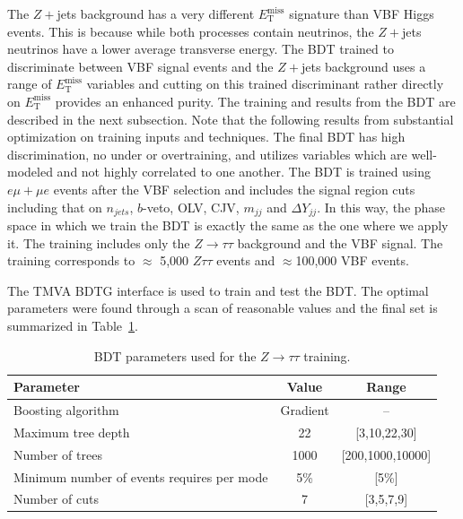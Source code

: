The $Z+$jets background has a very different $E_{\text{T}}^{\text{miss}}$ signature than VBF Higgs events. This is because while both processes contain neutrinos, the $Z+$jets neutrinos have a lower average transverse energy. The BDT trained to discriminate between VBF signal events and the $Z+$jets background uses a range of $E_{\text{T}}^{\text{miss}}$ variables and cutting on this trained discriminant rather directly on $E_{\text{T}}^{\text{miss}}$ provides an enhanced purity. The training and results from the BDT are described in the next subsection. Note that the following results from substantial optimization on training inputs and techniques. The final BDT has high discrimination, no under or overtraining, and utilizes variables which are well-modeled and not highly correlated to one another.  
The BDT is trained using $e\mu+\mu e$ events after the VBF selection and includes the signal region cuts including that on $n_{jets}$, $b$-veto, OLV, CJV, $m_{jj}$ and $\Delta Y_{jj}$. In this way, the phase space in which we train the BDT is exactly the same as the one where we apply it. The training includes only the $Z\rightarrow\tau\tau$ background and the VBF signal. The training corresponds to $\approx$ 5,000 $Z\tau\tau$ events and $\approx$100,000 VBF events.

The TMVA BDTG interface is used to train and test the BDT. The optimal parameters were found through a scan of reasonable values and the final set is summarized in Table~\ref{tab:ZBDTparameters}.

\begin{table}[htbp!]
\centering
\begin{tabular}{|l|c|c|}
\hline
Parameter                                    & Value    & Range     \\
\hline
Boosting algorithm                           & Gradient & --        \\
Maximum tree depth                           &  22      & [3,10,22,30]    \\
Number of trees                              &  1000    & [200,1000,10000] \\
Minimum number of events requires per mode   &  5\%     & [5\%]\\
Number of cuts                               &  7       & [3,5,7,9]  \\
\hline
\end{tabular}
\caption{BDT parameters used for the $Z\rightarrow\tau\tau$ training.} 
\label{tab:ZBDTparameters}
\end{table}

